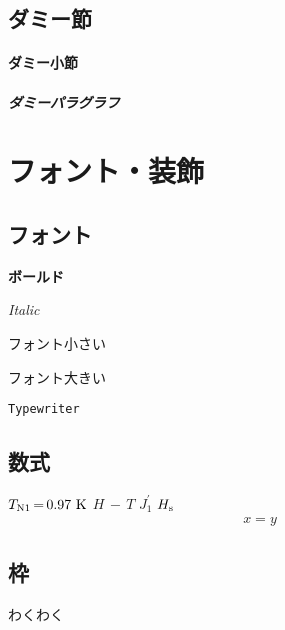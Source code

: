 \documentclass[11pt,a4paper, titlepage]{ltjsbook}
\newcommand{\記}{\begin{center} 記 \end{center}}
\newcommand{\挨拶}{\noindent 拝啓 \ifcase\month\or 厳寒\or 春寒\or 早春
    \or 陽寒\or 新緑\or 向暑\or 猛暑\or 残暑\or 初秋\or 仲秋\or 晩秋\or 初冬
    \fi の候, ますますご清栄のこととお喜び申し上げます.}
\newcommand{\myeq}[2]{\begin{eqnarray}#1\label{eq:#2}\end{eqnarray}}
\begin{document}
\section{ダミー節 \label{sec:1}}
\lipsum[6-20]
\subsubsection{ダミー小節}
\lipsum[21-25]
\paragraph{ダミーパラグラフ}
\lipsum[20]

\chapter{フォント・装飾}
\section{フォント}
\textbf{ボールド} \par
\textit{Italic} \par
\small{フォント小さい} \par
\large{フォント大きい} \par
{} \par
\texttt{Typewriter} \par
{} \par
{} \par


\section{数式}
$T_{\rm N1}\,{=}\,0.97~{\rm K}$
$H\,{-}\,T$
$J_1^{\prime}$
$H_{\rm s}$
\myeq{x=y}{1}
\section{枠}
\begin{tcolorbox}[colframe=black, colback=white,
        colbacktitle=blue, coltitle=white,
        fonttitle=\bfseries\sffamily,title=
        純粋な枠]
    わくわく
\end{tcolorbox}
\end{document}
